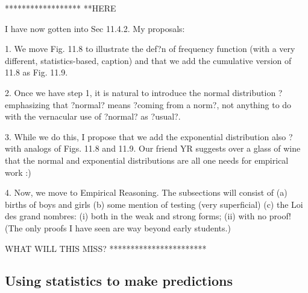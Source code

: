 



******************
**HERE

I have now gotten into Sec 11.4.2.  My proposals:

1. We move Fig. 11.8 to illustrate the def?n of frequency function (with a very different, statistics-based, caption) and that we add the cumulative version of 11.8 as Fig. 11.9.

2. Once we have step 1, it is natural to introduce the normal distribution ? emphasizing that ?normal? means ?coming from a norm?, not anything to do with the vernacular use of ?normal? as ?usual?.

3. While we do this, I propose that we add the exponential distribution also ? with analogs of Figs. 11.8 and 11.9.  Our friend YR suggests over a glass of wine that the normal and exponential distributions are all one needs for empirical work :)

4. Now, we move to Empirical Reasoning.  The subsections will consist of
(a) births of boys and girls
(b) some mention of testing (very superficial)
(c) the Loi des grand nombres: (i) both in the weak and strong forms; (ii) with no proof!  (The only proofs I have seen are way beyond early students.)

WHAT WILL THIS MISS?
***********************

\subsection{Using statistics to make predictions}
\label{statistical-predictions}

